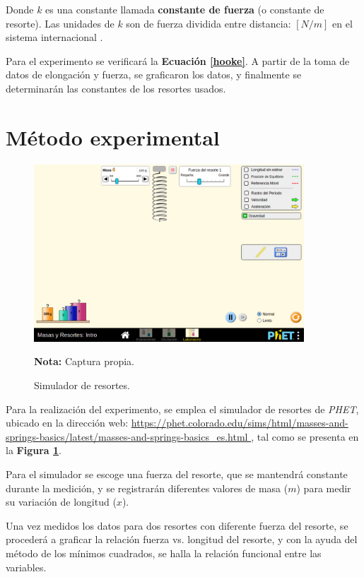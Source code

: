 \documentclass[letter,11pt]{article}
\newcommand{\source}[1]{\vspace{-11pt} \caption*{\small{\textbf{Nota:} {#1}}}}
\begin{document}
Donde $k$ es una constante llamada \textbf{constante de fuerza} (o constante de
resorte). Las unidades de $k$ son de fuerza dividida entre distancia: $[N/m]$ en
el sistema internacional \cite{Young&Freedman}.

Para el experimento se verificará la \textbf{Ecuación \ref{hooke}}.
A partir de la toma de datos de elongación y fuerza, se graficaron los datos, y
finalmente se determinarán las constantes de los resortes usados.

\section{Método experimental}

\begin{figure}
\centering
\includegraphics[width=0.90\textwidth]{resources/f2.eps}
\caption{Simulador de resortes.}
\label{figura2}
\source{Captura propia.}
\end{figure}

Para la realización del experimento, se emplea el simulador de resortes de
\emph{PHET}, ubicado en la dirección web: \url{
https://phet.colorado.edu/sims/html/masses-and-springs-basics/latest/masses-and-springs-basics_es.html
}, tal como se presenta en la \textbf{Figura \ref{figura2}}.

Para el simulador se escoge una fuerza del resorte, que se mantendrá constante
durante la medición, y se registrarán diferentes valores de masa ($m$) para
medir su variación de longitud ($x$).

Una vez medidos los datos para dos resortes con diferente fuerza del resorte,
se procederá a graficar la relación fuerza vs. longitud del resorte, y con la
ayuda del método de los mínimos cuadrados, se halla la relación funcional entre
las variables.
\end{document}

